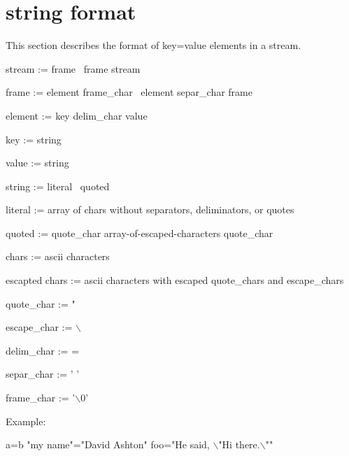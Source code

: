 \documentclass[dvipdfm,11pt]{article}
\begin{document}
\section{string format}
This section describes the format of key=value elements in a stream.

stream := frame \vline\ frame stream

frame := element frame\_char \vline\ element separ\_char frame

element := key delim\_char value

key := string

value := string

string := literal \vline\ quoted

literal := array of chars without separators, deliminators, or quotes

quoted := quote\_char array-of-escaped-characters quote\_char

chars := ascii characters

escapted chars := ascii characters with escaped quote\_chars and escape\_chars

quote\_char := "

escape\_char := $\backslash$

delim\_char := =

separ\_char := ' '

frame\_char := '$\backslash$0'

Example:

	a=b "my name"="David Ashton" foo="He said, $\backslash$"Hi there.$\backslash$""
	


\end{document}

